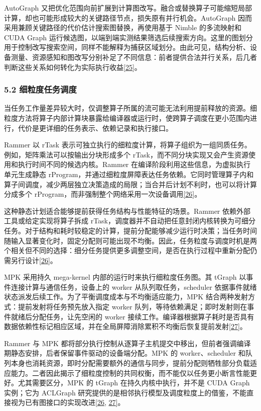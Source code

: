 \documentclass[UTF8,11pt,fontset=windows]{ctexart}
\begin{document}
AutoGraph 又把优化范围向前扩展到计算图改写。融合或替换算子可能缩短局部计算，却也可能形成较大的关键路径节点，损失原有并行机会。AutoGraph 因而采用兼顾关键路径的代价估计搜索图替换，再使用基于 Nimble 的多流映射和 CUDA Graph 运行候选图，以端到端实测结果筛选后续搜索方向。这里的图划分用于控制改写搜索空间，同样不能解释为捕获区域划分。由此可见，结构分析、设备测量、资源感知和图改写分别补足了不同信息：前者提供合法并行关系，后几者判断这些关系如何转化为实际执行收益\protect\hyperlink{ref-25}{{[}25{]}}。

\hypertarget{section-5-2}{%
\subsubsection{\texorpdfstring{\textbf{5.2 细粒度任务调度}}{5.2 细粒度任务调度}}\label{section-5-2}}

当任务工作量差异较大时，仅调整算子所属的流可能无法利用提前释放的资源。细粒度方法将算子内部计算块暴露给编译器或运行时，使跨算子调度在更小范围内进行，代价是更详细的任务表示、依赖记录和执行接口。

Rammer 以 rTask 表示可独立执行的细粒度计算，将算子组织为一组同质任务。例如，矩阵乘法可以按输出分块形成多个 rTask，而不同分块实现又会产生资源使用和执行时间不同的候选内核。Rammer 在编译阶段利用这些信息，为虚拟执行单元生成静态 rProgram，并通过细粒度屏障表达任务依赖。它同时管理算子内和算子间调度，减少两层独立决策造成的局限；当合并后计划不利时，也可以将计算分成多个 rProgram，而非强制整个网络采用一次设备调用\protect\hyperlink{ref-26}{{[}26{]}}。

这种静态计划适合能够提前获得任务结构与性能特征的场景。Rammer 依赖外部工具或给定实现将算子拆成 rTask，调度器并不自动把任意封闭内核转换为可细分任务。对于结构和耗时较稳定的计算，提前分配能够减少运行时决策；当任务时间随输入显著变化时，固定分配则可能出现不均衡。因此，任务粒度与调度时机是两个相关但不同的选择：细分任务提供更多调整空间，是否在执行过程中重新分配仍需另行设计\protect\hyperlink{ref-26}{{[}26{]}}。

MPK 采用持久 mega-kernel 内部的运行时来执行细粒度任务图。其 tGraph 以事件连接计算与通信任务，设备上的 worker 从队列取任务，scheduler 依据事件就绪状态派发后续工作。为了平衡调度成本与不均衡适应能力，MPK 结合两种发射方式：提前发射将任务预先放入指定 worker 队列，等待依赖满足；即时发射则在事件就绪后分配任务，让先空闲的 worker 接续工作。编译器根据算子耗时是否具有数据依赖性标记相应区域，并在全局屏障消除累积不均衡后恢复提前发射\protect\hyperlink{ref-27}{{[}27{]}}。

Rammer 与 MPK 都将部分执行控制从逐算子主机提交中移出，但前者强调编译期静态安排，后者保留事件驱动的设备端分配。MPK 的 worker、scheduler 和队列本身也消耗资源，即时分配需要额外的通信与同步，提前分配则牺牲部分负载适应能力。二者因此揭示了细粒度控制的共同权衡，而不能仅以任务更小断言性能更好。尤其需要区分，MPK 的 tGraph 在持久内核中执行，并不是 CUDA Graph 实例；它为 ACLGraph 研究提供的是相邻执行模型及调度粒度上的借鉴，不能直接视为已有图接口的实现改进\protect\hyperlink{ref-26}{{[}26}, \protect\hyperlink{ref-27}{27{]}}。
\end{document}
